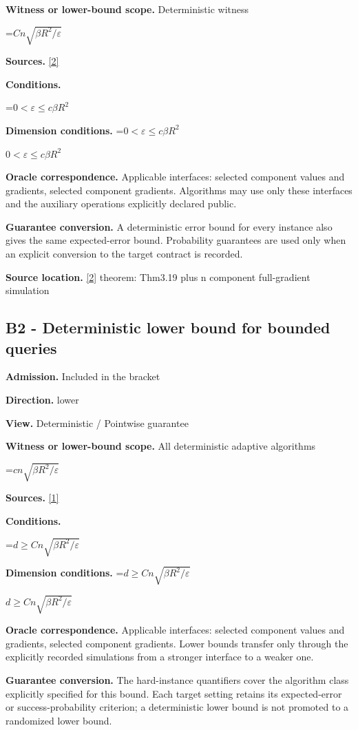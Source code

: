 \documentclass[10pt,a4paper]{article}
\newcommand{\AtlasMath}[1]{\par\begingroup\centering\setbox0=\hbox{$\displaystyle #1$}\ifdim\wd0>1.4\linewidth\typeout{ATLAS WIDE FORMULA: \the\wd0}\fi\ifdim\wd0>\linewidth\resizebox{\linewidth}{!}{\box0}\else\box0\fi\par\endgroup}
\newcommand{\AtlasInlineMath}[1]{\begingroup\setbox0=\hbox{$#1$}\ifdim\wd0>.4\linewidth\endgroup\AtlasMath{#1}\else\endgroup$#1$\fi}
\begin{document}
\textbf{Witness or lower-bound scope.} Deterministic witness

\AtlasMath{Cn\sqrt{\beta R^2/\varepsilon}}
\textbf{Sources.} \href{https://arxiv.org/pdf/1405.4980}{[2]}

\textbf{Conditions.} 
\AtlasMath{0<\varepsilon\le c\beta R^2}


\textbf{Dimension conditions.} \AtlasInlineMath{0<\varepsilon\le c\beta R^2}

\textbf{Oracle correspondence.} Applicable interfaces: selected component values and gradients, selected component gradients. Algorithms may use only these interfaces and the auxiliary operations explicitly declared public.

\textbf{Guarantee conversion.} A deterministic error bound for every instance also gives the same expected-error bound. Probability guarantees are used only when an explicit conversion to the target contract is recorded.

\textbf{Source location.} \href{https://arxiv.org/pdf/1405.4980}{[2]} theorem: Thm3.19 plus n component full-gradient simulation

\subsection{B2 - Deterministic lower bound for bounded queries}
\textbf{Admission.} Included in the bracket

\textbf{Direction.} lower

\textbf{View.} Deterministic / Pointwise guarantee

\textbf{Witness or lower-bound scope.} All deterministic adaptive algorithms

\AtlasMath{cn\sqrt{\beta R^2/\varepsilon}}
\textbf{Sources.} \href{https://arxiv.org/pdf/1605.08003v3}{[1]}

\textbf{Conditions.} 
\AtlasMath{d\ge Cn\sqrt{\beta R^2/\varepsilon}}


\textbf{Dimension conditions.} \AtlasInlineMath{d\ge Cn\sqrt{\beta R^2/\varepsilon}}

\textbf{Oracle correspondence.} Applicable interfaces: selected component values and gradients, selected component gradients. Lower bounds transfer only through the explicitly recorded simulations from a stronger interface to a weaker one.

\textbf{Guarantee conversion.} The hard-instance quantifiers cover the algorithm class explicitly specified for this bound. Each target setting retains its expected-error or success-probability criterion; a deterministic lower bound is not promoted to a randomized lower bound.
\end{document}
